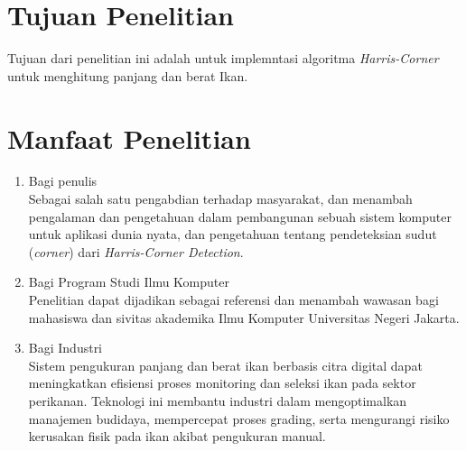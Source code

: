 \section{Tujuan Penelitian}
Tujuan dari penelitian ini adalah untuk implemntasi algoritma \emph{Harris-Corner} untuk menghitung panjang dan berat Ikan.

\section{Manfaat Penelitian}
\begin{enumerate}
    \item Bagi penulis\\
    Sebagai salah satu pengabdian terhadap masyarakat, dan menambah pengalaman dan pengetahuan dalam pembangunan sebuah sistem komputer untuk aplikasi dunia nyata, dan pengetahuan tentang pendeteksian sudut (\emph{corner}) dari \emph{Harris-Corner Detection}.
    
    \item Bagi Program Studi Ilmu Komputer\\
    Penelitian dapat dijadikan sebagai referensi dan menambah wawasan bagi mahasiswa dan sivitas akademika Ilmu Komputer Universitas Negeri Jakarta.

    \item Bagi Industri\\
    Sistem pengukuran panjang dan berat ikan berbasis citra digital dapat meningkatkan efisiensi proses monitoring dan seleksi ikan pada sektor perikanan. Teknologi ini membantu industri dalam mengoptimalkan manajemen budidaya, mempercepat proses grading, serta mengurangi risiko kerusakan fisik pada ikan akibat pengukuran manual.
\end{enumerate}

\begin{comment}

\end{comment}

